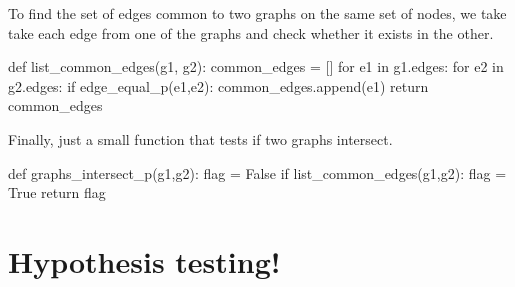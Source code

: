 To find the set of edges common to two graphs on the same set of nodes, we take take each
edge from one of the graphs and check whether it exists in the other. 


\nwenddocs{}\plusendmoddef\nwstartdeflinemarkup{}\nwenddeflinemarkup
def list_common_edges(g1, g2):
     common_edges = []
     for e1 in g1.edges:
          for e2 in g2.edges:
             if  edge_equal_p(e1,e2):
                  common_edges.append(e1)
     return common_edges
\nwendcode{}\nwdocspar

Finally, just a small function that tests if two graphs intersect. 

\nwenddocs{}\plusendmoddef\nwstartdeflinemarkup{}\nwenddeflinemarkup
def graphs_intersect_p(g1,g2):
     flag = False
     if list_common_edges(g1,g2):     
          flag = True 
     return flag
\nwendcode{}\nwdocspar

\section{Hypothesis testing!}

\nwenddocs{}\endmoddef\nwstartdeflinemarkup{}\nwenddeflinemarkup
{}\nwendcode{}\nwdocspar
\nwenddocs{}

